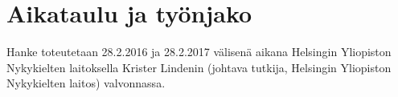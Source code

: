 \documentclass[12pt,a4paper,finnish,oneside]{article}
\begin{document}
\section{Aikataulu ja työnjako}


Hanke toteutetaan 28.2.2016 ja 28.2.2017 välisenä aikana Helsingin Yliopiston Nykykielten laitoksella Krister Lindenin (johtava tutkija, Helsingin Yliopiston Nykykielten laitos) valvonnassa.






\end{document}
